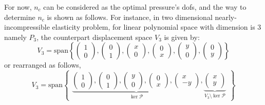 For now, $n_c$ can be considered as the optimal pressure's dofs, and the way to determine $n_c$ is shown as follows. For instance, in two dimensional nearly-incompressible elasticity problem, for linear polynomial space with dimension is 3 namely $P_3$, the counterpart displacement space $V_3$ is given by:
\begin{equation}
V_3 = \mathrm{span} \left \{
\begin{pmatrix} 1 \\ 0 \end{pmatrix},
\begin{pmatrix} 0 \\ 1 \end{pmatrix},
\begin{pmatrix} x \\ 0 \end{pmatrix},
\begin{pmatrix} 0 \\ x \end{pmatrix},
\begin{pmatrix} y \\ 0 \end{pmatrix},
\begin{pmatrix} 0 \\ y \end{pmatrix}
\right \}
\end{equation}
or rearranged as follows,
\begin{equation}\label{base1}
V_3 = \mathrm{span} 
\begin{Bmatrix}
\underbrace{
\begin{pmatrix} 1 \\ 0 \end{pmatrix},
\begin{pmatrix} 0 \\ 1 \end{pmatrix},
\begin{pmatrix} y \\ 0 \end{pmatrix},
\begin{pmatrix} 0 \\ x \end{pmatrix},
\begin{pmatrix} x \\ -y \end{pmatrix}
}_{\ker \mathcal P},
\underbrace{
\begin{pmatrix} x \\ y \end{pmatrix}
}_{V_3\setminus \ker \mathcal P}
\end{Bmatrix}
\end{equation}
